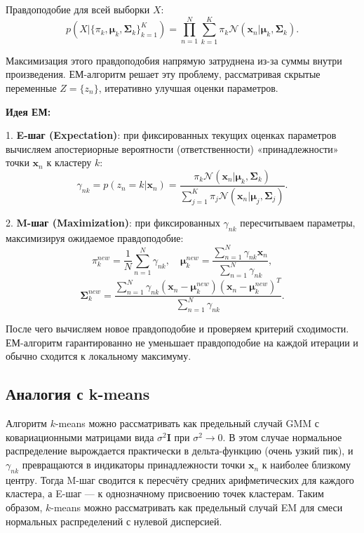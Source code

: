 Правдоподобие для всей выборки $X$:
\begin{equation*}
p(X|\{\pi_k,\boldsymbol{\mu}_k,\boldsymbol{\Sigma}_k\}_{k=1}^K) = \prod_{n=1}^N \sum_{k=1}^K \pi_k \mathcal{N}(\mathbf{x}_n|\boldsymbol{\mu}_k, \boldsymbol{\Sigma}_k).
\end{equation*}

Максимизация этого правдоподобия напрямую затруднена из-за суммы внутри произведения. ЕМ-алгоритм решает эту проблему, рассматривая скрытые переменные $Z=\{z_n\}$, итеративно улучшая оценки параметров.

\textbf{Идея ЕМ:} 

1. \textbf{E-шаг (Expectation)}: при фиксированных текущих оценках параметров вычисляем апостериорные вероятности (ответственности) «принадлежности» точки $\mathbf{x}_n$ к кластеру $k$:
\begin{equation*}
\gamma_{nk} = p(z_n = k|\mathbf{x}_n) = \frac{\pi_k \mathcal{N}(\mathbf{x}_n|\boldsymbol{\mu}_k,\boldsymbol{\Sigma}_k)}{\sum_{j=1}^K \pi_j \mathcal{N}(\mathbf{x}_n|\boldsymbol{\mu}_j,\boldsymbol{\Sigma}_j)}.
\end{equation*}

2. \textbf{M-шаг (Maximization)}: при фиксированных $\gamma_{nk}$ пересчитываем параметры, максимизируя ожидаемое правдоподобие:
\begin{equation*}
\pi_k^{new} = \frac{1}{N}\sum_{n=1}^N \gamma_{nk}, \quad \boldsymbol{\mu}_k^{new} = \frac{\sum_{n=1}^N \gamma_{nk}\mathbf{x}_n}{\sum_{n=1}^N \gamma_{nk}},
\end{equation*}
\begin{equation*}
\boldsymbol{\Sigma}_k^{new} = \frac{\sum_{n=1}^N \gamma_{nk}(\mathbf{x}_n - \boldsymbol{\mu}_k^{new})(\mathbf{x}_n - \boldsymbol{\mu}_k^{new})^T}{\sum_{n=1}^N \gamma_{nk}}.
\end{equation*}

После чего вычисляем новое правдоподобие и проверяем критерий сходимости. ЕМ-алгоритм гарантированно не уменьшает правдоподобие на каждой итерации и обычно сходится к локальному максимуму.

\subsection{Аналогия с k-means}

Алгоритм $k$-means можно рассматривать как предельный случай GMM с ковариационными матрицами вида $\sigma^2 \mathbf{I}$ при $\sigma^2 \to 0$. В этом случае нормальное распределение вырождается практически в дельта-функцию (очень узкий пик), и $\gamma_{nk}$ превращаются в индикаторы принадлежности точки $\mathbf{x}_n$ к наиболее близкому центру. Тогда M-шаг сводится к пересчёту средних арифметических для каждого кластера, а E-шаг --- к однозначному присвоению точек кластерам. Таким образом, $k$-means можно рассматривать как предельный случай EM для смеси нормальных распределений с нулевой дисперсией.


